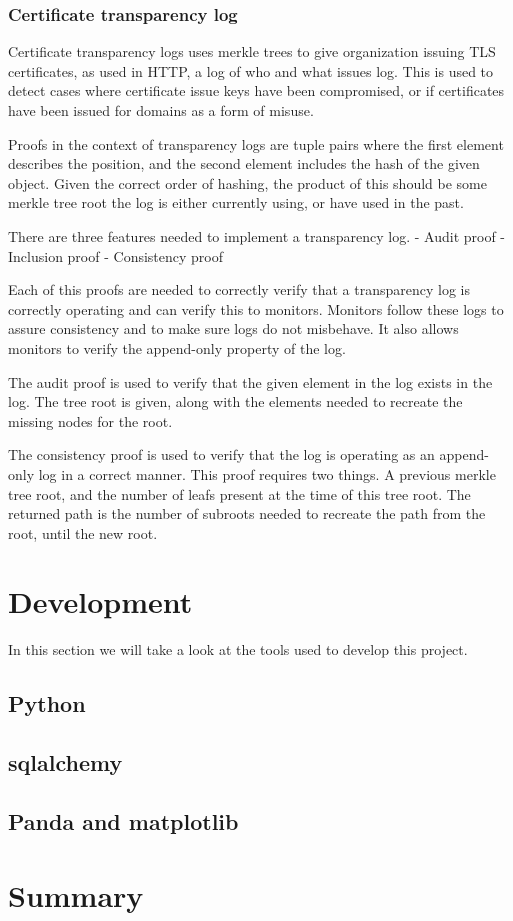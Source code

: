 \documentclass[../Main/thesis.tex]{subfiles}
\begin{document}

    \subsubsection*{Certificate transparency log}
    Certificate transparency logs uses merkle trees to give organization issuing
    TLS certificates, as used in HTTP, a log of who and what issues
    log.\cite{b.-laurie-a.-langley-e.kaster-google-2013} This is used to detect
    cases where certificate issue keys have been compromised, or if certificates
    have been issued for domains as a form of misuse.

    Proofs in the context of transparency logs are tuple pairs where the first
    element describes the position, and the second element includes the hash of
    the given object. Given the correct order of hashing, the product of this
    should be some merkle tree root the log is either currently using, or have
    used in the past.

    There are three features needed to implement a transparency log.
    - Audit proof
    - Inclusion proof
    - Consistency proof

    Each of this proofs are needed to correctly verify that a transparency log
    is correctly operating and can verify this to monitors.  Monitors follow
    these logs to assure consistency and to make sure logs do not misbehave. It
    also allows monitors to verify the append-only property of the log.

   The audit proof is used to  verify that the given element in the log exists
   in the log. The tree root is given, along with the elements needed to
   recreate the missing nodes for the root.

   The consistency proof is used to verify that the log is operating as an
   append-only log in a correct manner. This proof requires two things. A
   previous merkle tree root, and the number of leafs present at the time of
   this tree root. The returned path is the number of subroots needed to
   recreate the path from the root, until the new root.



\section{Development}\label{sec:development} 
In this section we will take a look at the tools used to develop this project.

    \subsection*{Python}
    \subsection*{sqlalchemy}
    \subsection*{Panda and matplotlib}

\section*{Summary}\label{sec:summary-theory} 

\blankpage
\end{document}
